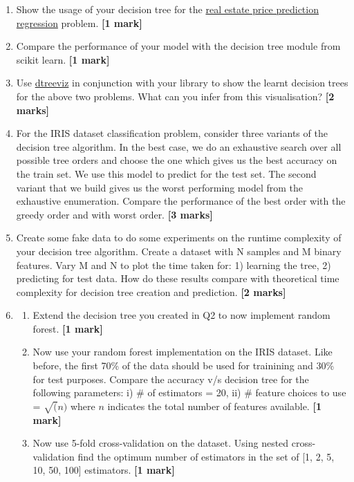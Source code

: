 \documentclass[colorlinks]{article}
\begin{document}
\begin{enumerate}
	\item Show the usage of your decision tree for the \href{https://archive.ics.uci.edu/ml/datasets/Real+estate+valuation+data+set}{real estate price prediction regression} problem. \textbf{[1 mark]}
	\item Compare the performance of your model with the decision tree module from scikit learn. \textbf{[1 mark]}
	\item Use \href{https://github.com/parrt/dtreeviz}{dtreeviz} in conjunction with your library to show the learnt decision trees for the above two problems. What can you infer from this visualisation? \textbf{[2 marks]}
	\item For the IRIS dataset classification problem, consider three variants of the decision tree algorithm. In the best case, we do an exhaustive search over all possible tree orders and choose the one which gives us the best accuracy on the train set. We use this model to predict for the test set. The second variant that we build gives us the worst performing model from the exhaustive enumeration. Compare the performance of the best order with the greedy order and with worst order. \textbf{[3 marks]}
	\item Create some fake data to do some experiments on the runtime complexity of your decision tree algorithm. Create a dataset with N samples and M binary features. Vary M and N to plot the time taken for: 1) learning the tree, 2) predicting for test data. How do these results compare with theoretical time complexity for decision tree creation and prediction. \textbf{[2 marks]}

	 \item \begin{enumerate}
	 	\item Extend the decision tree you created in Q2 to now implement random forest.  \textbf{[1 mark]}
	 	\item Now use your random forest implementation on the IRIS dataset. Like before, the first 70\% of the data should be used for trainining and 30\% for test purposes. Compare the accuracy v/s decision tree for the following parameters: i) \# of estimators = 20, ii) \# feature choices to use = $\sqrt(n)$ where $n$ indicates the total number of features available.  \textbf{[1 mark]}
	 	\item Now use 5-fold cross-validation on the dataset. Using nested cross-validation find the optimum number of estimators in the set of [1, 2, 5, 10, 50, 100] estimators.  \textbf{[1 mark]}
	 \end{enumerate}
 

\end{enumerate}
\end{document}
